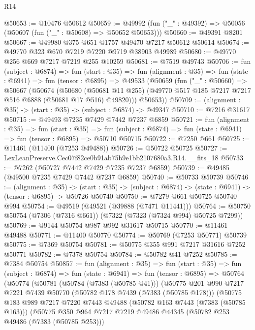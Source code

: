 \begin{lexlean}{R14}
\begin{coremodule}
@50653 := @10476 @50612
@50659 := @49992 (fun ("_" : @49392) => @50056 (@50607 (fun ("_" : @50608) => @50652 @50653)))
@50660 := @49391 @8201
@50667 := @49980 @375 @651 @1757 @49470 @7217 @50612 @50614
@50674 := @49770 @323 @670 @7219 @7220 @9719 @38903 @49989
@50680 := @49770 @256 @669 @7217 @7219 @255 @10259
@50681 := @7519 @49743
@50706 := fun (subject : @6874) =>
  fun (start : @35) =>
  fun (alignment : @35) =>
  fun (state : @6941) =>
  fun (tensor : @6895) =>
  @49533
    (@50659
      (fun ("_" : @50660) =>
      @50667
        (@50674
          (@50680
            (@50681 @11 @255)
            (@49770 @517 @185 @7217 @7217 @516 @6888 (@50681 @17 @516) @49820)))
        @50653))
@50709 := (alignment : @35) -> (start : @35) -> (subject : @6874) -> @49347
@50710 := @7216 @31617
@50715 := @49493 @7235 @7429 @7442 @7237 @6859
@50721 := fun (alignment : @35) =>
  fun (start : @35) =>
  fun (subject : @6874) => fun (state : @6941) => fun (tensor : @6895) => @50710 @50715
@50722 := @7250 @661
@50725 := @11461 (@11400 (@7253 @49488))
@50726 := @50722 @50725
@50727 := LexLeanPreserve.Cec07f82ce0b91ab75b9e1bb2107680a3.R14.__fits_18
@50733 := @7262 (@50727 @7442 @7429 @7235 @7237 @6859)
@50739 := @49485 (@49500 @7235 @7429 @7442 @7237 @6859)
@50740 := @50733 @50739
@50746 := (alignment : @35) ->
  (start : @35) -> (subject : @6874) -> (state : @6941) -> (tensor : @6895) -> @50726 @50740
@50750 := @7279 @661 @50725 @50740 @994
@50754 := @49519 (@49521 (@39888 (@7471 @11441)))
@50764 := @50750 @50754 (@7306 (@7316 @661)) (@7322 (@7323 (@7324 @994) @50725 @7299))
@50769 := @9144 @50754 @987 @992 @31617 @50715
@50770 := @11461 @49488
@50771 := @11400 @50770
@50774 := @50769 (@7253 @50771) @50739
@50775 := @7369 @50754
@50781 := @50775 @355 @991 @7217 @31616 @7252 @50771
@50782 := @7378 @50754
@50784 := @50782 @41 @7252
@50785 := @7384 @50754
@50857 := fun (alignment : @35) =>
  fun (start : @35) =>
  fun (subject : @6874) =>
  fun (state : @6941) =>
  fun (tensor : @6895) =>
  @50764
    (@50774
      (@50781
        (@50784 (@7383 (@50785 @41)))
        (@50775
          @201
          @990
          @7217
          @7221
          @7439
          @50770
          (@50782 @178 @7439 (@7383 (@50785 @178)))
          (@50775
            @183
            @989
            @7217
            @7220
            @7443
            @49488
            (@50782 @163 @7443 (@7383 (@50785 @163)))
            (@50775
              @350
              @964
              @7217
              @7219
              @49486
              @44345
              (@50782 @253 @49486 (@7383 (@50785 @253)))

\end{coremodule}
\end{lexlean}
